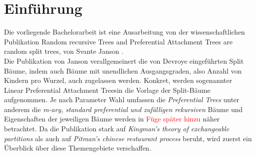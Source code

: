 \chapter*{Einführung}
Die vorliegende Bachelorarbeit ist eine Ausarbeitung von der wissenschaftlichen Publikation \glqq Random recursive Trees and Preferential Attachment Trees are random split trees\grqq, von Svante Janson \cite{janson2019random}.\\
Die Publikation von Janson verallgemeinert die von Devroye \cite{devroye1998universal} eingeführten \glqq Split Bäume\grqq, indem auch Bäume mit unendlichen Ausgangsgraden, also Anzahl von Kindern pro Wurzel, auch zugelassen werden. Konkret, werden sogenannter \glqq Linear Preferential Attachment Trees\grqq in die Vorlage der Split-Bäume aufgenommen. Je nach Parameter Wahl umfassen die \textit{Preferential Trees} unter anderem die \textit{m-ary, standard preferential und zufälligen rekursiven} Bäume und Eigenschaften der jeweiligen Bäume werden in \textcolor{red}{Füge später hinzu} näher betrachtet. Da die Publikation stark auf \textit{Kingman's theory of exchangeable partitions} \cite{kingman1978representation,kingman1982coalescent} als auch auf \textit{Pitman's chinese restaurant process} \cite{pitman2006combinatorial,pitman1995exchangeable} beruht, wird zuerst ein Überblick über diese Themengebiete verschaffen.